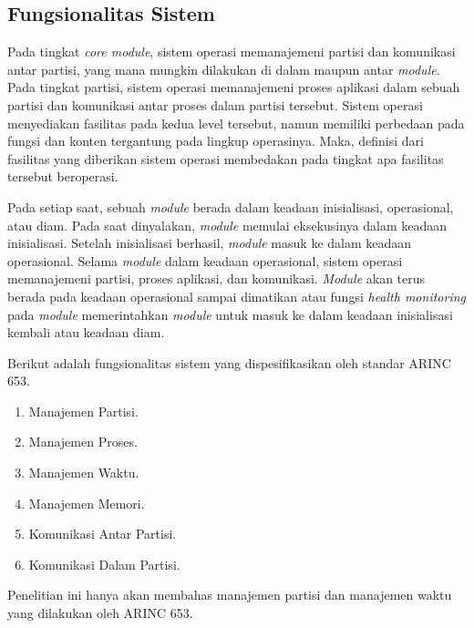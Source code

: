\subsection{Fungsionalitas Sistem}

Pada tingkat \textit{core module}, sistem operasi memanajemeni partisi dan komunikasi antar
partisi, yang mana mungkin dilakukan di dalam maupun antar \textit{module}.  Pada tingkat
partisi, sistem operasi memanajemeni proses aplikasi dalam sebuah partisi dan komunikasi antar
proses dalam partisi tersebut.  Sistem operasi menyediakan fasilitas pada kedua level tersebut,
namun memiliki perbedaan pada fungsi dan konten tergantung pada lingkup operasinya.  Maka,
definisi dari fasilitas yang diberikan sistem operasi membedakan pada tingkat apa fasilitas
tersebut beroperasi.

Pada setiap saat, sebuah \textit{module} berada dalam keadaan inisialisasi, operasional, atau
diam.  Pada saat dinyalakan, \textit{module} memulai eksekusinya dalam keadaan inisialisasi.
Setelah inisialisasi berhasil, \textit{module} masuk ke dalam keadaan operasional.  Selama
\textit{module} dalam keadaan operasional, sistem operasi memanajemeni partisi, proses aplikasi,
dan komunikasi.  \textit{Module} akan terus berada pada keadaan operasional sampai dimatikan
atau fungsi \textit{health monitoring} pada \textit{module} memerintahkan \textit{module} untuk
masuk ke dalam keadaan inisialisasi kembali atau keadaan diam.

Berikut adalah fungsionalitas sistem yang dispesifikasikan oleh standar ARINC 653.

\begin{enumerate}

    \item Manajemen Partisi.

    \item Manajemen Proses.

    \item Manajemen Waktu.

    \item Manajemen Memori.

    \item Komunikasi Antar Partisi.

    \item Komunikasi Dalam Partisi.

\end{enumerate}

Penelitian ini hanya akan membahas manajemen partisi dan manajemen waktu yang dilakukan oleh
ARINC 653.

